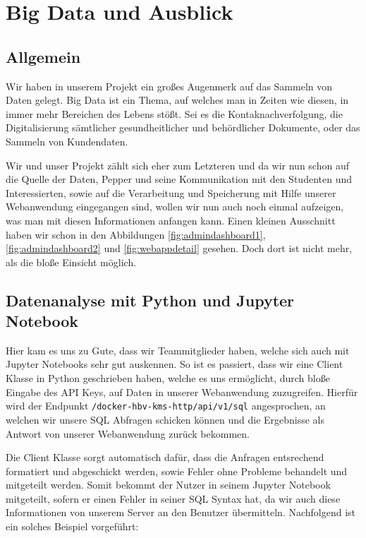 \newcommand{\bigdatachapter}{Kapitel 9. }
\chapter{Big Data und Ausblick}
\label{chapter:big-data}
\lhead{\bigdatachapter \emph{Big Data und Ausblick}}

\section{Allgemein}
Wir haben in unserem Projekt ein großes Augenmerk auf das Sammeln von Daten gelegt. Big Data ist ein Thema, auf welches man in Zeiten wie diesen, in immer mehr Bereichen des Lebens stößt. Sei es die Kontaknachverfolgung, die Digitalisierung sämtlicher gesundheitlicher und behördlicher Dokumente, oder das Sammeln von Kundendaten.

Wir und unser Projekt zählt sich eher zum Letzteren und da wir nun schon auf die Quelle der Daten, Pepper und seine Kommunikation mit den Studenten und Interessierten, sowie auf die Verarbeitung und Speicherung mit Hilfe unserer Webanwendung eingegangen sind, wollen wir nun auch noch einmal aufzeigen, was man mit diesen Informationen anfangen kann. Einen kleinen Ausschnitt haben wir schon in den Abbildungen \ref{fig:admindashboard1}, \ref{fig:admindashboard2} und \ref{fig:webappdetail} gesehen. Doch dort ist nicht mehr, als die bloße Einsicht möglich.

\section{Datenanalyse mit Python und Jupyter Notebook}
Hier kam es uns zu Gute, dass wir Teammitglieder haben, welche sich auch mit Jupyter Notebooks sehr gut auskennen. So ist es passiert, dass wir eine Client Klasse in Python geschrieben haben, welche es uns ermöglicht, durch bloße Eingabe des API Keys, auf Daten in unserer Webanwendung zuzugreifen. Hierfür wird der Endpunkt \verb|/docker-hbv-kms-http/api/v1/sql| angesprochen, an welchen wir unsere SQL Abfragen schicken können und die Ergebnisse als Antwort von unserer Webanwendung zurück bekommen.

Die Client Klasse sorgt automatisch dafür, dass die Anfragen entsrechend formatiert und abgeschickt werden, sowie Fehler ohne Probleme behandelt und mitgeteilt werden. Somit bekommt der Nutzer in seinem Jupyter Notebook mitgeteilt, sofern er einen Fehler in seiner SQL Syntax hat, da wir auch diese Informationen von unserem Server an den Benutzer übermitteln. Nachfolgend ist ein solches Beispiel vorgeführt:\\

